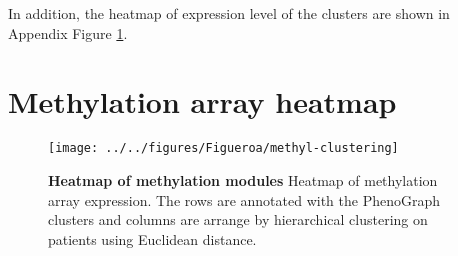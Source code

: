 \documentclass{article}
\begin{document}
In addition, the heatmap of expression level of the clusters are shown in Appendix Figure \ref{heatmap}.

\clearpage

\appendix

\section{Methylation array heatmap}

\begin{figure}[htbp]
\begin{center}
\texttt{[image: ../../figures/Figueroa/methyl-clustering]}
\caption[Heatmap of methylation modules]{\textbf{Heatmap of methylation modules} Heatmap of methylation array expression. The rows are annotated with the PhenoGraph clusters and columns are arrange by hierarchical clustering on patients using Euclidean distance. }
\label{heatmap}
\end{center}
\end{figure}


\clearpage

 

\end{document}
